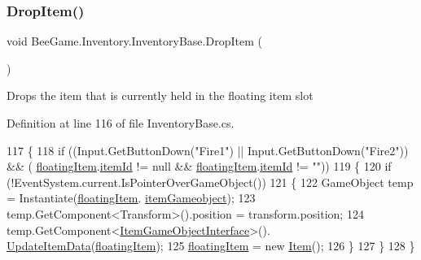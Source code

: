 \subsubsection{\texorpdfstring{Drop\+Item()}{DropItem()}}
{\footnotesize\ttfamily void Bee\+Game.\+Inventory.\+Inventory\+Base.\+Drop\+Item (\begin{DoxyParamCaption}{ }\end{DoxyParamCaption})\hspace{0.3cm}{\ttfamily [private]}}



Drops the item that is currently held in the floating item slot 



Definition at line 116 of file Inventory\+Base.\+cs.


\begin{DoxyCode}
117         \{
118             \textcolor{keywordflow}{if} ((Input.GetButtonDown(\textcolor{stringliteral}{"Fire1"}) || Input.GetButtonDown(\textcolor{stringliteral}{"Fire2"})) && (
      \hyperlink{class_bee_game_1_1_inventory_1_1_inventory_base_aa018ec0acd2aa39dd922f0a1bc1411e6}{floatingItem}.\hyperlink{struct_bee_game_1_1_items_1_1_item_aa85bfeab893271c26f8ca41b638ada1c}{itemId} != null && \hyperlink{class_bee_game_1_1_inventory_1_1_inventory_base_aa018ec0acd2aa39dd922f0a1bc1411e6}{floatingItem}.\hyperlink{struct_bee_game_1_1_items_1_1_item_aa85bfeab893271c26f8ca41b638ada1c}{itemId} != \textcolor{stringliteral}{""}))
119             \{
120                 \textcolor{keywordflow}{if} (!EventSystem.current.IsPointerOverGameObject())
121                 \{
122                     GameObject temp = Instantiate(\hyperlink{class_bee_game_1_1_inventory_1_1_inventory_base_aa018ec0acd2aa39dd922f0a1bc1411e6}{floatingItem}.
      \hyperlink{struct_bee_game_1_1_items_1_1_item_af28a8cd4a0eff9d4c18189c5ab525f18}{itemGameobject});
123                     temp.GetComponent<Transform>().position = transform.position;
124                     temp.GetComponent<\hyperlink{class_bee_game_1_1_items_1_1_item_game_object_interface}{ItemGameObjectInterface}>().
      \hyperlink{class_bee_game_1_1_items_1_1_item_game_object_interface_aa88fbff044f2dceb7633b1b41175d085}{UpdateItemData}(\hyperlink{class_bee_game_1_1_inventory_1_1_inventory_base_aa018ec0acd2aa39dd922f0a1bc1411e6}{floatingItem});
125                     \hyperlink{class_bee_game_1_1_inventory_1_1_inventory_base_aa018ec0acd2aa39dd922f0a1bc1411e6}{floatingItem} = \textcolor{keyword}{new} \hyperlink{struct_bee_game_1_1_items_1_1_item}{Item}();
126                 \}
127             \}
128         \}
\end{DoxyCode}
\mbox{\label{class_bee_game_1_1_inventory_1_1_inventory_base_a22d2b2a1621c8cf19925692ac8cc5923}} 
